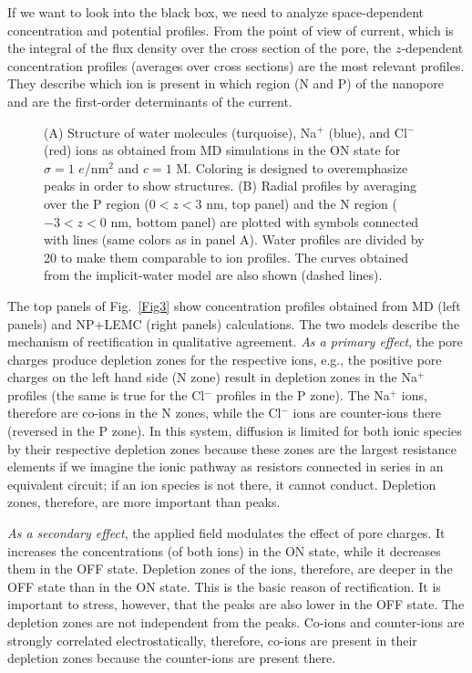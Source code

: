 \documentclass[fleqn,10pt]{SelfArx} %
\begin{document}
If we want to look into the black box, we need to analyze space-dependent concentration and potential profiles.
From the point of view of current, which is the integral of the flux density over the cross section of the pore, the $z$-dependent concentration profiles (averages over cross sections) are the most relevant profiles.
They describe which ion is present in which region (N and P) of the nanopore and are the first-order determinants of the current.

\begin{figure*}[t]
\begin{center}
\end{center}
\caption{(A) Structure of water molecules (turquoise), Na$^{+}$ (blue), and Cl$^{-}$ (red) ions as obtained from MD simulations in the ON state for $\sigma=1$ $e$/nm$^{2}$ and $c=1$ M.
Coloring is designed to overemphasize peaks in order to show structures. 
(B) Radial profiles by averaging over the P region ($0<z<3$ nm, top panel) and the N region ($-3<z<0$ nm, bottom panel) are plotted with symbols connected with lines (same colors as in panel A). Water profiles are divided by 20 to make them comparable to ion profiles.
The curves obtained from the implicit-water model are also shown (dashed lines).}
\label{Fig4}
\end{figure*} 


The top panels of Fig.\ \ref{Fig3} show concentration profiles obtained from MD (left panels) and NP+LEMC (right panels) calculations.
The two models describe the mechanism of rectification in qualitative agreement.
\emph{As a primary effect}, the pore charges produce depletion zones for the respective ions, e.g., the positive pore charges on the left hand side (N zone) result in depletion zones in the Na$^{+}$ profiles (the same is true for the Cl$^{-}$ profiles in the P zone).
The Na$^{+}$ ions, therefore are co-ions in the N zones, while the Cl$^{-}$ ions are counter-ions there (reversed in the P zone).
In this system, diffusion is limited for both ionic species by their respective depletion zones because these zones are the largest resistance elements if we imagine the ionic pathway as resistors connected in series in an equivalent circuit; if an ion species is not there, it cannot conduct.
Depletion zones, therefore, are more important than peaks.

\emph{As a secondary effect}, the applied field modulates the effect of pore charges. 
It increases the concentrations (of both ions) in the ON state, while it decreases them in the OFF state.
Depletion zones of the ions, therefore, are deeper in the OFF state than in the ON state.
This is the basic reason of rectification.
It is important to stress, however, that the peaks are also lower in the OFF state.
The depletion zones are not independent from the peaks. 
Co-ions and counter-ions are strongly correlated electrostatically, therefore, co-ions are present in their depletion zones because the counter-ions are present there.
\end{document}

